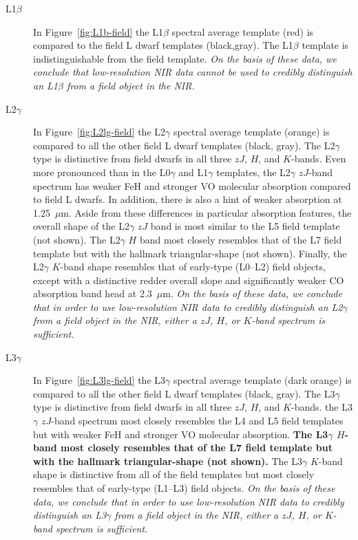\documentclass[12pt,preprint]{aastex}
\begin{document}
\begin{description}
\item[L1$\beta$]{
In Figure~\ref{fig:L1b-field} the L1$\beta$ spectral average template (red) is compared to the field L dwarf templates (black,gray). The L1$\beta$ template is indistinguishable from the field template.
\emph{On the basis of these data, we conclude that low-resolution NIR data cannot be used to credibly distinguish an L1$\beta$ from a field object in the NIR.}
}

\item[L2$\gamma$]{
In Figure~\ref{fig:L2lg-field} the L2$\gamma$ spectral average template (orange) is compared to all the other field L dwarf templates (black, gray). 
The L2$\gamma$ type is distinctive from field dwarfs in all three $zJ$, $H$, and $K$-bands. 
Even more pronounced than in the L0$\gamma$ and L1$\gamma$ templates, the L2$\gamma$ $zJ$-band spectrum has weaker FeH and stronger VO molecular absorption compared to field L dwarfs. 
In addition, there is also a hint of weaker  absorption at 1.25~$\mu$m. Aside from these differences in particular absorption features, the overall shape of the L2$\gamma$ $zJ$ band is most similar to the L5 field template (not shown).
The L2$\gamma$ $H$ band most closely resembles that of the L7 field template but with the hallmark  triangular-shape (not shown). 
Finally, the L2$\gamma$ $K$-band shape resembles that of early-type (L0--L2) field objects, except with a distinctive redder overall slope and significantly weaker CO absorption band head at 2.3~$\mu$m. 
\emph{On the basis of these data, we conclude that in order to use low-resolution NIR data to credibly distinguish an L2$\gamma$ from a field object in the NIR, either a $zJ$, $H$, or $K$-band spectrum is sufficient.}
}

\item[L3$\gamma$]{
In Figure~\ref{fig:L3lg-field} the L3$\gamma$ spectral average template (dark orange) is compared to all the other field L dwarf templates (black, gray). 
The L3$\gamma$ type is distinctive from field dwarfs in all three $zJ$, $H$, and $K$-bands. 
the L3$\gamma$ $zJ$-band spectrum most closely resembles the L4 and L5 field templates but with weaker FeH and stronger VO molecular absorption. 
\textbf{The L3$\gamma$ $H$-band most closely resembles that of the L7 field template but with the hallmark  triangular-shape (not shown). }
The L3$\gamma$ $K$-band shape is distinctive from all of the field templates but most closely resembles that of early-type (L1--L3) field objects. 
\emph{On the basis of these data, we conclude that in order to use low-resolution NIR data to credibly distinguish an L3$\gamma$ from a field object in the NIR, either a $zJ$, $H$, or $K$-band spectrum is sufficient.}
}


\end{description}
\end{document}
